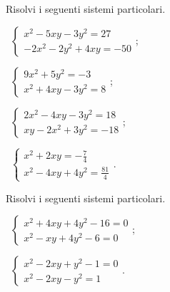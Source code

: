 \begin{esercizio}[\Ast]
\label{ese:6.43}
Risolvi i seguenti sistemi particolari.
\begin{multicols}{2}
 \begin{enumeratea}
 \item~$\left\{\begin{array}{l}x^2-5xy-3y^2=27\\-2x^2-2y^2+4xy=-50\end{array}\right.$;
 \item~$\left\{\begin{array}{l}9x^2+5y^2=-3\\x^2+4xy-3y^2=8\end{array}\right.$;
 \item~$\left\{\begin{array}{l}2x^2-4xy-3y^2=18\\xy-2x^2+3y^2=-18\end{array}\right.$;
 \item~$\left\{\begin{array}{l}x^2+2xy=-\frac 7 4\\x^2-4xy+4y^2=\frac{81} 4\end{array}\right.$.
 \end{enumeratea}
\end{multicols}
\end{esercizio}
\pagebreak
\begin{esercizio}[\Ast]
\label{ese:6.44}
Risolvi i seguenti sistemi particolari.
\begin{multicols}{2}
 \begin{enumeratea}
 \item~$\left\{\begin{array}{l}x^2+4xy+4y^2-16=0\\x^2-xy+4y^2-6=0\end{array}\right.$;
 \item~$\left\{\begin{array}{l}x^2-2xy+y^2-1=0\\x^2-2xy-y^2=1\end{array}\right.$.
 \end{enumeratea}
\end{multicols}
\end{esercizio}


